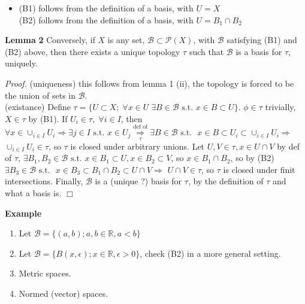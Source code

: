 \documentclass[12pt]{article}
\newcommand{\pset}[1]{ \mathcal{P}(#1) }
\newcommand{\st}[0]{ \textrm{ s.t. } }
\newcommand{\rimply}[0] { \Rightarrow }
\newcommand{\reals}[0] { \mathbb{R}}
\newcommand{\eps}[0] {  \epsilon }
\newcommand{\B}[0] { \mathcal{B} }
\begin{document}
\begin{flushleft}
\begin{itemize}
\item[] 
                (B1) follows from the definition of a basis, with $U = X$ \\
                (B2) follows from the definition of a basis, with $U = B_1 \cap B_2$
            \end{itemize}\end{flushleft}\begin{flushleft} 
 { \bf Lemma }{ \bf 2 }Conversely, if $X$ is any set, $\B \subset \pset{X}$, with $\B$ satisfying (B1) and (B2) above, then there exists a unique topology $\tau$ such that $\B$ is a basis for $\tau$, uniquely.\begin{flushleft} 
 \emph{Proof.  }(uniqueness) this follows from lemma 1 (ii), the topology is forced to be the union of sets in $\B$. \\
            (existance) Define $\tau = \{ U \subset X; \; \forall x \in U \; \exists B \in \B \st x \in B \subset U \}$. $\phi \in \tau$ trivially, $X \in \tau$ by (B1). If $U_i \in \tau, \; \forall i \in I$, then $\forall x \in \cup_{i \in I} U_i \rimply \exists j \in I \st x \in U_j  \underset{\tau}{\overset{\textrm{def of} }{\rimply}} \exists B \in \B \st$ $ x \in B \subset U_i \subset \cup_{i \in I} U_i \rimply $ $ \cup_{i \in I} U_i \in \tau$, so $\tau$ is closed under arbitrary unions. Let $U, V \in \tau, x \in U \cap V$ by def of $\tau$, $\exists B_1, B_2 \in \B \st x \in B_1 \subset U, x \in B_2 \subset V$, so $x \in B_1 \cap B_2$, so by (B2) $\exists B_3 \in \B \st$ $ x \in B_3 \subset B_1 \cap B_2 \subset U \cap V \rimply$ $ U \cap V \in \tau$, so $\tau$ is closed under finit intersections. Finally, $\B$ is a (unique ?) basis for $\tau$, by the definition of $\tau$ and what a basis is. $\Box$\end{flushleft}\end{flushleft}\begin{flushleft} 
 { \bf Example }\begin{enumerate}
\item
                Let $\B = \{ (a,b); a,b \in \reals, a<b \}$
            \item
                Let $\B = \{ B(x, \eps); x \in \reals, \eps>0 \}$, check (B2) in a more general setting.
            \item
                Metric spaces.
            \item
                Normed (vector) spaces.
            \end{enumerate}\end{flushleft}\begin{flushleft} 

\end{flushleft}
\end{document}
